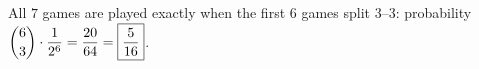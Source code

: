 All $7$ games are played exactly when the first $6$ games split $3$--$3$: probability $\dbinom63\cdot\dfrac{1}{2^6}=\dfrac{20}{64}=\boxed{\dfrac{5}{16}}$.
